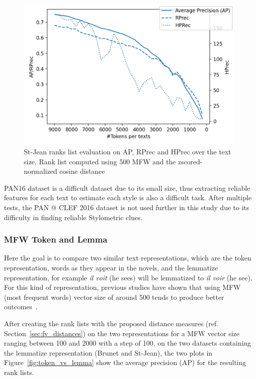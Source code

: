 \begin{figure}
  \centering
  \includegraphics[width=\linewidth]{img/degradation.png}
  \caption{St-Jean ranks list evaluation on AP, RPrec and HPrec over the text size. Rank list computed using 500 MFW and the zscored-normalized cosine distance}
  \label{img:degradation}
\end{figure}

PAN16 dataset is a difficult dataset due to its small size, thus extracting reliable features for each text to estimate each style is also a difficult task.
After multiple tests, the PAN @ CLEF 2016 dataset is not used further in this study due to its difficulty in finding reliable Stylometric clues.

\subsubsection{MFW Token and Lemma}
\label{sec:mfw_token_lemma}

Here the goal is to compare two similar text representations, which are the token representation, words as they appear in the novels, and the lemmatize representation, for example \textit{il voit} (he sees) will be lemmatized to \textit{il voir} (he see).
For this kind of representation, previous studies have shown that using MFW (most frequent words) vector size of around 500 tends to produce better outcomes~\cite{savoy_text_representation}.

After creating the rank lists with the proposed distance measures (ref. Section~\ref{sec:fv_distances}) on the two representations for a MFW vector size ranging between 100 and 2000 with a step of 100, on the two datasets containing the lemmatize representation (Brunet and St-Jean), the two plots in Figure~\ref{fig:token_vs_lemma} show the average precision (AP) for the resulting rank lists.

